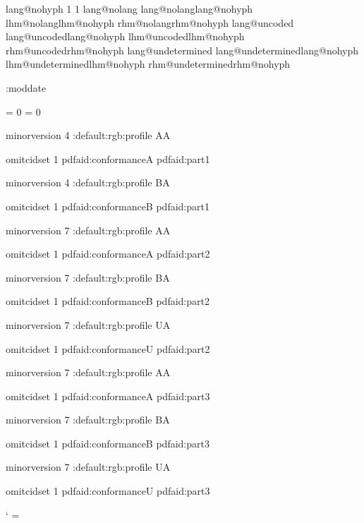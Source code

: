 \def\newnameddialect#1#2{%
    \expandafter\chardef\csname lang@#2\endcsname\csname lang@#1\endcsname
    \expandafter\chardef\csname lhm@#2\endcsname\csname lhm@#1\endcsname
    \expandafter\chardef\csname rhm@#2\endcsname\csname rhm@#1\endcsname}

\ifcsname lang@nohyph\endcsname \else
     1 1 \fi
\ifcsname lang@nolang\endcsname \else
    \newnameddialect {nohyph} {nolang} \fi
\ifcsname lang@uncoded\endcsname \else
    \newnameddialect {nohyph} {uncoded} \fi
\ifcsname lang@undetermined\endcsname \else
    \newnameddialect {nohyph} {undetermined} \fi



\newtoks\setembeddedfilesmoddate
    \setembeddedfilesmoddate{}
\newtoks\embeddedfiles:moddate
\def\minim:makedefaultmoddate{%
    \expandafter\edef\expandafter
        \minim:tmp\expandafter{\the\setembeddedfilesmoddate}%
    \embeddedfiles:moddate\expandafter{\minim:tmp}}


\newcount \pdfaconformancelevel
\pdfaconformancelevel = 0
\newcount \pdfuaconformancelevel
\pdfuaconformancelevel = 0

\def\pdfalevel#1#2{%
    \minim:pdfalinkattr{ /F 4}%
    \global\pdfaconformancelevel=#1\relax
    \ifcsname minim:pdfa:#1#2\endcsname \lastnamedcs\else
        \errmessage{Unknown pdf/a standard pdf/a-#1}\fi}

\def\minim:pdfasettings#1#2#3{%
    \pdfvariable minorversion #1\relax
    \minim:default:rgb:profile
    \if#2A\writedocumentstructure1\fi
    
    \pdfvariable omitcidset 1
    \setmetadata pdfaid:conformance{#2}%
    \setmetadata pdfaid:part{#3}}

\expandafter\def\csname minim:pdfa:1a\endcsname{\minim:pdfasettings 4A1}
\expandafter\def\csname minim:pdfa:1b\endcsname{\minim:pdfasettings 4B1}
\expandafter\def\csname minim:pdfa:2a\endcsname{\minim:pdfasettings 7A2}
\expandafter\def\csname minim:pdfa:2b\endcsname{\minim:pdfasettings 7B2}
\expandafter\def\csname minim:pdfa:2u\endcsname{\minim:pdfasettings 7U2}
\expandafter\def\csname minim:pdfa:3a\endcsname{\minim:pdfasettings 7A3}
\expandafter\def\csname minim:pdfa:3b\endcsname{\minim:pdfasettings 7B3}
\expandafter\def\csname minim:pdfa:3u\endcsname{\minim:pdfasettings 7U3}

\def\pdfualevel{
    \setmetadata pdfuaid:part {1}
    \tagging:enablepdfua
    \global\pdfuaconformancelevel= }


\catcode`\: = \minimpdfloaded

